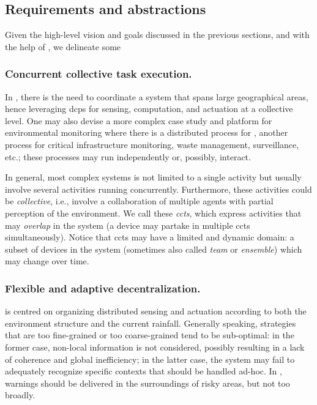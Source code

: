 \subsection{Requirements and abstractions}
Given the high-level vision and goals discussed in the previous sections, and with the help of \casename{},
 we delineate some 
%

\subsubsection{ Concurrent collective task execution.} 
%
In \casename{},
there is the need to coordinate
  a system that spans large geographical areas,
  hence leveraging \acp{dcp} for sensing, computation, and actuation
  at a collective level.
%
 One may also devise a more complex case study and platform
  for environmental monitoring
  where there is a distributed process for \casename{},
  another process for critical infrastructure monitoring,
 waste management,
 surveillance, etc.;
 these processes may run independently or,
 possibly,
 interact.

In general, most complex systems
 is not limited to a single activity
 but usually involve several activities running concurrently.
%
Furthermore,
these activities could be \emph{collective}, i.e.,
involve a collaboration of multiple agents with partial perception of the environment.
We call these \emph{\acp{cct}},
 which express activities that
 may \emph{overlap} in the system
 (a device may partake in multiple \acp{cct} simultaneously).
%
Notice that \acp{cct} may 
 have a limited and dynamic domain:
 a subset of devices in the system
 (sometimes also called \emph{team} or \emph{ensemble})
 which may change over time.

\subsubsection{ Flexible and adaptive decentralization.} 
%
\casename{}
is centred on organizing distributed sensing and actuation
according to both the environment structure and the current rainfall.
%
Generally speaking, 
 strategies that are too fine-grained or too coarse-grained tend to be sub-optimal:
 in the former case,
non-local information is not considered,
possibly resulting in a lack of coherence and global inefficiency;
 in the latter case, 
 the system may fail to adequately recognize 
 specific contexts that should be handled ad-hoc.
%
In \casename{}, 
 warnings should be delivered 
 in the surroundings of risky areas,
 but not too broadly.

